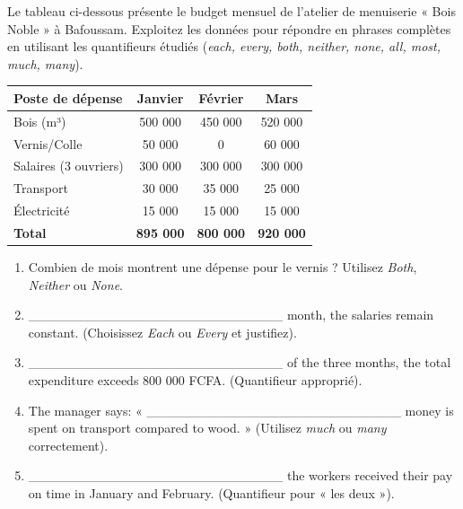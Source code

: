 \documentclass[11pt]{article}
\begin{document}
\begin{exercice}
Le tableau ci-dessous présente le budget mensuel de l'atelier de menuiserie « Bois Noble » à Bafoussam. Exploitez les données pour répondre en phrases complètes en utilisant les quantifieurs étudiés (\textit{each, every, both, neither, none, all, most, much, many}).

\begin{center}
\begin{tabular}{|l|c|c|c|}
\hline
\textbf{Poste de dépense} & \textbf{Janvier} & \textbf{Février} & \textbf{Mars} \\
\hline
Bois (m³) & 500 000 & 450 000 & 520 000 \\
\hline
Vernis/Colle & 50 000 & 0 & 60 000 \\
\hline
Salaires (3 ouvriers) & 300 000 & 300 000 & 300 000 \\
\hline
Transport & 30 000 & 35 000 & 25 000 \\
\hline
Électricité & 15 000 & 15 000 & 15 000 \\
\hline
\textbf{Total} & \textbf{895 000} & \textbf{800 000} & \textbf{920 000} \\
\hline
\end{tabular}
\end{center}
\begin{enumerate}
    \item Combien de mois montrent une dépense pour le vernis ? Utilisez \textit{Both}, \textit{Neither} ou \textit{None}.
    \item \_\_\_\_\_\_\_\_\_\_\_\_\_\_\_\_\_\_\_\_\_\_\_\_\_\_\_ month, the salaries remain constant. (Choisissez \textit{Each} ou \textit{Every} et justifiez).
    \item \_\_\_\_\_\_\_\_\_\_\_\_\_\_\_\_\_\_\_\_\_\_\_\_\_\_\_ of the three months, the total expenditure exceeds 800 000 FCFA. (Quantifieur approprié).
    \item The manager says: « \_\_\_\_\_\_\_\_\_\_\_\_\_\_\_\_\_\_\_\_\_\_\_\_\_\_\_ money is spent on transport compared to wood. » (Utilisez \textit{much} ou \textit{many} correctement).
    \item \_\_\_\_\_\_\_\_\_\_\_\_\_\_\_\_\_\_\_\_\_\_\_\_\_\_\_ the workers received their pay on time in January and February. (Quantifieur pour « les deux »).
\end{enumerate}
\end{exercice}
\end{document}
